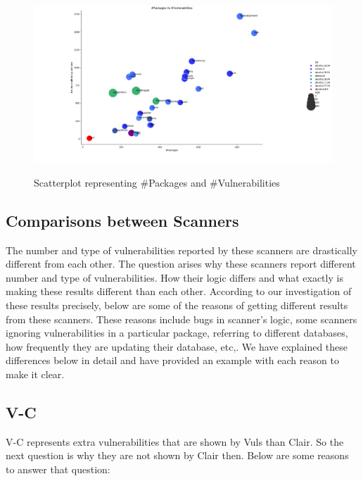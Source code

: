 \documentclass[a4paper,num-refs]{oup-contemporary}
\begin{document}
\begin{figure}[!htb]
        {\includegraphics[width=\columnwidth]
        {Figures/vulngraph.png}}
        \caption{\label{fig:graph1} Scatterplot representing \#Packages and \#Vulnerabilities}
      \end{figure}

\subsection{Comparisons between Scanners}

The number and type of vulnerabilities reported by these scanners are drastically different from each other.
The question arises why these scanners report different number and type of vulnerabilities.
How their logic differs and what exactly is making these results different than each other.
According to our investigation of these results precisely, below are some of the reasons of
getting different results from these scanners. These reasons include bugs in scanner's logic,
some scanners ignoring vulnerabilities in a particular package, referring to different databases,
how frequently they are updating their database, etc,. We have explained these differences below in detail
and have provided an example with each reason to make it clear.

\subsection{V-C}

V-C represents extra vulnerabilities that are shown by Vuls than Clair.
So the next question is why they are not shown by Clair then. 
Below are some reasons to answer that question:
\end{document}
